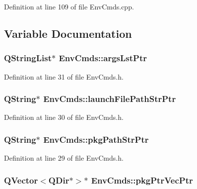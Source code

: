Definition at line 109 of file Env\-Cmds.\-cpp.



\subsection{Variable Documentation}
\hypertarget{namespace_env_cmds_a65efdbb4d947990b4cc75dd65ce5a034}{
\subsubsection[{args\-Lst\-Ptr}]{\setlength{\rightskip}{0pt plus 5cm}Q\-String\-List$\ast$ Env\-Cmds\-::args\-Lst\-Ptr}}\label{namespace_env_cmds_a65efdbb4d947990b4cc75dd65ce5a034}


Definition at line 31 of file Env\-Cmds.\-h.

\hypertarget{namespace_env_cmds_aaa855cfe7f6f519851a03e78818c7f76}{
\subsubsection[{launch\-File\-Path\-Str\-Ptr}]{\setlength{\rightskip}{0pt plus 5cm}Q\-String$\ast$ Env\-Cmds\-::launch\-File\-Path\-Str\-Ptr}}\label{namespace_env_cmds_aaa855cfe7f6f519851a03e78818c7f76}


Definition at line 30 of file Env\-Cmds.\-h.

\hypertarget{namespace_env_cmds_a4127d21ff0a3d32f2c8c4bb0900dec26}{
\subsubsection[{pkg\-Path\-Str\-Ptr}]{\setlength{\rightskip}{0pt plus 5cm}Q\-String$\ast$ Env\-Cmds\-::pkg\-Path\-Str\-Ptr}}\label{namespace_env_cmds_a4127d21ff0a3d32f2c8c4bb0900dec26}


Definition at line 29 of file Env\-Cmds.\-h.

\hypertarget{namespace_env_cmds_a90f3aa88627fb40ec6bd2f01b9576505}{
\subsubsection[{pkg\-Ptr\-Vec\-Ptr}]{\setlength{\rightskip}{0pt plus 5cm}Q\-Vector$<$Q\-Dir$\ast$$>$$\ast$ Env\-Cmds\-::pkg\-Ptr\-Vec\-Ptr}}\label{namespace_env_cmds_a90f3aa88627fb40ec6bd2f01b9576505}


